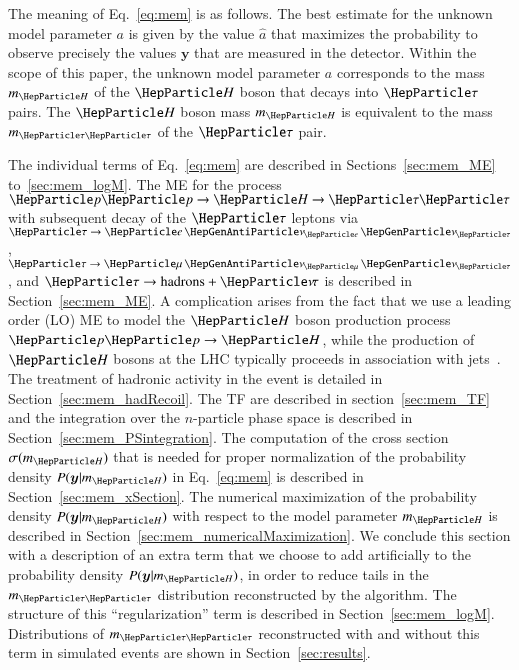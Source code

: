 The meaning of Eq.~\ref{eq:mem} is as follows.
The best estimate for the unknown model parameter $a$ is given by the
value $\hat{a}$ that maximizes the probability to observe precisely the 
values $\bm{y}$ that are measured in the detector. 
Within the scope of this paper, the unknown model parameter $a$
corresponds to the mass $m_{\PHiggs}$ of the $\PHiggs$ boson that decays into $\Pgt$ pairs.
The $\PHiggs$ boson mass $m_{\PHiggs}$ is equivalent to the mass $m_{\Pgt\Pgt}$ of the $\Pgt$ pair.

The individual terms of Eq.~\ref{eq:mem} are described in
Sections~\ref{sec:mem_ME} to~\ref{sec:mem_logM}.
The ME for the process $\Pp\Pp \to \PHiggs \to \Pgt\Pgt$
with subsequent decay of the $\Pgt$ leptons 
via $\Pgt \to \enunu$, $\Pgt \to \mununu$, and $\Pgt \to \textrm{hadrons} + \Pnut$
is described in Section~\ref{sec:mem_ME}.
A complication arises from the fact that we use a leading order (LO)
ME to model the $\PHiggs$ boson production process $\Pp\Pp \to
\PHiggs$, while the production of $\PHiggs$ bosons at the LHC typically
proceeds in association with jets~\cite{Alwall:2010cq}.
The treatment of hadronic activity in the event is detailed in Section~\ref{sec:mem_hadRecoil}.
The TF are described in section~\ref{sec:mem_TF} and
the integration over the $n$-particle phase space is described in
Section~\ref{sec:mem_PSintegration}.
The computation of the cross section $\sigma(m_{\PHiggs})$ that is needed for proper normalization of the probability density $P(\bm{y}|m_{\PHiggs})$
in Eq.~\ref{eq:mem} is described in Section~\ref{sec:mem_xSection}.
The numerical maximization of the probability density $P(\bm{y}|m_{\PHiggs})$
with respect to the model parameter $m_{\PHiggs}$ is described in
Section~\ref{sec:mem_numericalMaximization}.
We conclude this section with a description of an extra term that we
choose to add artificially to the probability density $P(\bm{y}|m_{\PHiggs})$, in
order to reduce tails in the $m_{\Pgt\Pgt}$ distribution reconstructed
by the algorithm. The structure of this ``regularization'' term is described in
Section~\ref{sec:mem_logM}.
Distributions of $m_{\Pgt\Pgt}$ reconstructed with and without this
term in simulated events are shown in Section~\ref{sec:results}.



